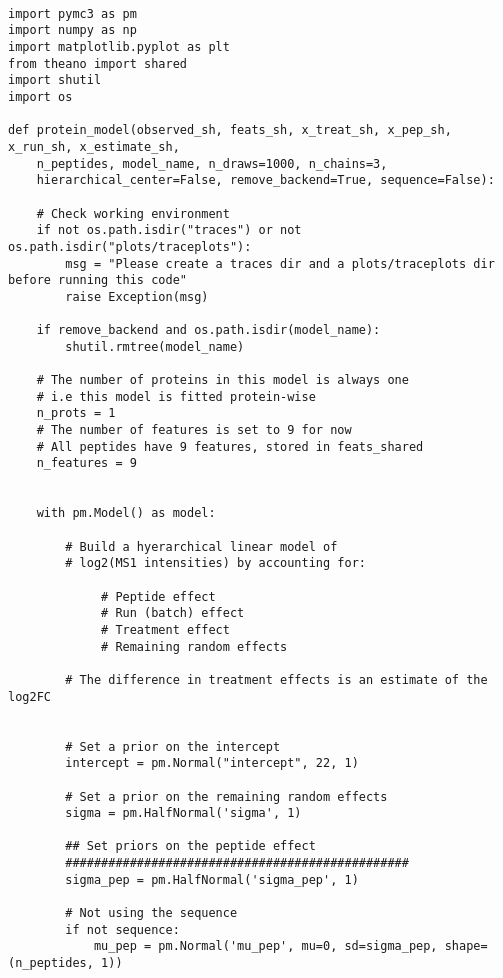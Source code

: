 \documentclass[a4paper]{article}
\begin{document}
\renewcommand{\theFancyVerbLine}{
  \sffamily\textcolor[rgb]{0.5,0.5,0.5}{\scriptsize\arabic{FancyVerbLine}}}

\begin{verbatim}

import pymc3 as pm
import numpy as np
import matplotlib.pyplot as plt
from theano import shared
import shutil
import os

def protein_model(observed_sh, feats_sh, x_treat_sh, x_pep_sh, x_run_sh, x_estimate_sh,
    n_peptides, model_name, n_draws=1000, n_chains=3,
    hierarchical_center=False, remove_backend=True, sequence=False):

    # Check working environment  
    if not os.path.isdir("traces") or not os.path.isdir("plots/traceplots"):
        msg = "Please create a traces dir and a plots/traceplots dir before running this code"
        raise Exception(msg)

    if remove_backend and os.path.isdir(model_name):
        shutil.rmtree(model_name)

    # The number of proteins in this model is always one
    # i.e this model is fitted protein-wise
    n_prots = 1
    # The number of features is set to 9 for now
    # All peptides have 9 features, stored in feats_shared
    n_features = 9
    

    with pm.Model() as model:
           
        # Build a hyerarchical linear model of
        # log2(MS1 intensities) by accounting for:

             # Peptide effect
             # Run (batch) effect
             # Treatment effect
             # Remaining random effects

        # The difference in treatment effects is an estimate of the log2FC


        # Set a prior on the intercept
        intercept = pm.Normal("intercept", 22, 1)
        
        # Set a prior on the remaining random effects
        sigma = pm.HalfNormal('sigma', 1)

        ## Set priors on the peptide effect
        ################################################
        sigma_pep = pm.HalfNormal('sigma_pep', 1)

        # Not using the sequence
        if not sequence:
            mu_pep = pm.Normal('mu_pep', mu=0, sd=sigma_pep, shape=(n_peptides, 1))


\end{verbatim}
\end{document}
